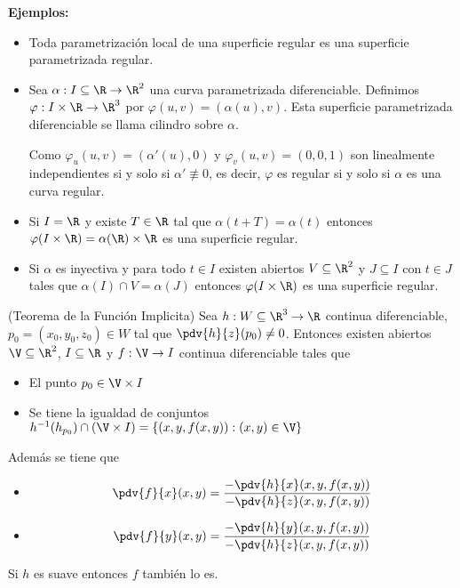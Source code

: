 \documentclass{article}
\begin{document}
\noindent\textbf{Ejemplos:} 
\begin{itemize}
    \item Toda parametrización local de una superficie regular es una superficie parametrizada 
    regular.

    \item Sea $\alpha:I\subseteq\R\to\R^{2}$ una curva parametrizada diferenciable. Definimos
    $\varphi:I\times\R\to\R^{3}$ por $\varphi(u,v)=(\alpha(u),v)$. Esta superficie parametrizada 
    diferenciable se llama cilindro sobre $\alpha$.
    \vspace{4mm}

    \noindent Como $\varphi_{u}(u,v)=(\alpha'(u),0)$ y $\varphi_{v}(u,v)=(0,0,1)$ son linealmente
    independientes si y solo si $\alpha'\not\equiv0$, es decir, $\varphi$ es regular si y solo si
    $\alpha$ es una curva regular.

    \item Si $I=\R$ y existe $T\in\R$ tal que $\alpha(t+T)=\alpha(t)$ entonces 
    $\varphi(I\times\R)=\alpha(\R)\times\R$ es una superficie regular.

    \item Si $\alpha$ es inyectiva y para todo $t\in I$ existen abiertos $V\subseteq\R^{2}$ y 
    $J\subseteq I$ con $t\in J$ tales que $\alpha(I)\cap V=\alpha(J)$ entonces $\varphi(I\times\R)$
    es una superficie regular.
\end{itemize}

\begin{teo}
    (Teorema de la Función Implicita) Sea $h:W\subseteq\R^{3}\to\R$ continua diferenciable, 
    $p_{0}=(x_{0},y_{0},z_{0})\in W$ tal que $\pdv{h}{z}(p_{0})\neq0$. Entonces existen abiertos
    $\V\subseteq\R^{2}$, $I\subseteq\R$ y $f:\V\to I$ continua diferenciable tales que
    \begin{itemize}
        \item El punto $p_{0}\in\V\times I$
        \item Se tiene la igualdad de conjuntos $h^{-1}(h_{p_{0}})\cap(\V\times I)=
        \{(x,y,f(x,y)):(x,y)\in\V\}$
    \end{itemize}
    Además se tiene que
    \begin{itemize}
        \item
        \begin{equation*}
            \pdv{f}{x}(x,y)=\frac{-\pdv{h}{x}(x,y,f(x,y))}{-\pdv{h}{z}(x,y,f(x,y))}
        \end{equation*}
        \item
        \begin{equation*}
            \pdv{f}{y}(x,y)=\frac{-\pdv{h}{y}(x,y,f(x,y))}{-\pdv{h}{z}(x,y,f(x,y))}
        \end{equation*}
    \end{itemize}
    Si $h$ es suave entonces $f$ también lo es.
\end{teo}
\end{document}
